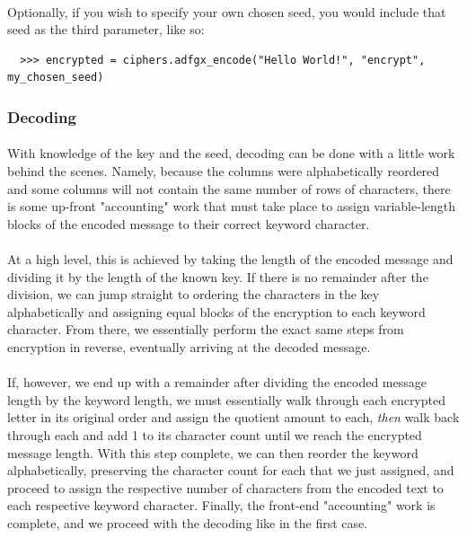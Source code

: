 \documentclass[12pt,a4paper]{article}
\begin{document}
\paragraph{}
Optionally, if you wish to specify your own chosen seed, you would include 
that seed as the third parameter, like so:

\begin{verbatim}
  >>> encrypted = ciphers.adfgx_encode("Hello World!", "encrypt", my_chosen_seed)
\end{verbatim}

\subsubsection{Decoding}
\paragraph{}
With knowledge of the key and the seed, decoding can be done with a little 
work behind the scenes.  Namely, because the columns were alphabetically 
reordered and some columns will not contain the same number of rows of 
characters, there is some up-front "accounting" work that must take place to 
assign variable-length blocks of the encoded message to their correct keyword 
character.

\paragraph{}
At a high level, this is achieved by taking the length of the encoded message 
and dividing it by the length of the known key.  If there is no remainder after 
the division, we can jump straight to ordering the characters in the key 
alphabetically and assigning equal blocks of the encryption to each keyword 
character.  From there, we essentially perform the exact same steps from 
encryption in reverse, eventually arriving at the decoded message.

\paragraph{}
If, however, we end up with a remainder after dividing the encoded message 
length by the keyword length, we must essentially walk through each encrypted 
letter in its original order and assign the quotient amount to each, 
\textit{then} walk back through each and add 1 to its character count until we 
reach the encrypted message length.  With this step complete, 
we can then reorder the keyword alphabetically, preserving the character count 
for each that we just assigned, and proceed to assign the respective number of 
characters from the encoded text to each respective keyword character.  
Finally, the front-end "accounting" work is complete, and we proceed with the 
decoding like in the first case.
\end{document}
